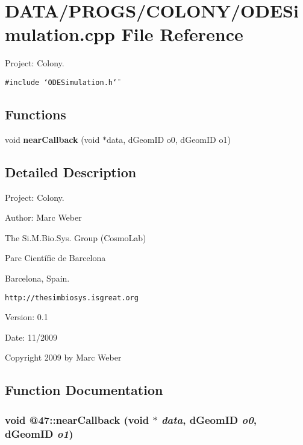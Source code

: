 \section{DATA/PROGS/COLONY/ODESimulation.cpp File Reference}
\label{ODESimulation_8cpp}
Project: Colony. 

{\tt \#include \char`\"{}ODESimulation.h\char`\"{}}\par
\subsection*{Functions}
\begin{CompactItemize}
\item 
void {\bf nearCallback} (void $\ast$data, dGeomID o0, dGeomID o1)
\end{CompactItemize}


\subsection{Detailed Description}
Project: Colony. 

\begin{Desc}
\item[Author:]Marc Weber\par
 The Si.M.Bio.Sys. Group (CosmoLab)\par
 Parc Científic de Barcelona\par
 Barcelona, Spain.\par
 {\tt http://thesimbiosys.isgreat.org} \end{Desc}
\begin{Desc}
\item[Version:]0.1 \end{Desc}
\begin{Desc}
\item[Date:]11/2009\end{Desc}
Copyright 2009 by Marc Weber 

\subsection{Function Documentation}
\subsubsection{\setlength{\rightskip}{0pt plus 5cm}void @47::nearCallback (void $\ast$ {\em data}, \/  dGeomID {\em o0}, \/  dGeomID {\em o1})\hspace{0.3cm}{\tt  [static]}}\label{ODESimulation_8cpp_f2e91e773ba2bd4ffe3bd108ee6355af}


